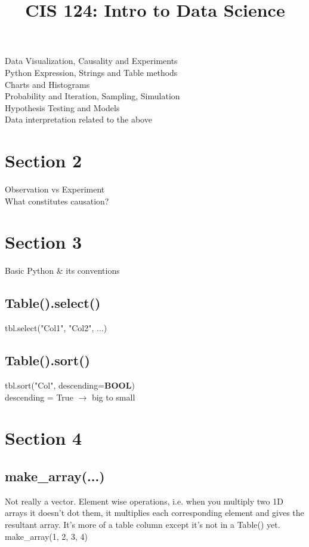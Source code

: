 \documentclass[10pt, a4paper, twocolumn]{article}
\title{CIS 124: Intro to Data Science}
\author{\authorstyle{Miles Kent}}
\date{}
\begin{document}
\graphicspath{ {./images/} }

\maketitle


    Data Visualization, Causality and Experiments\\
    Python Expression, Strings and Table methods\\
    Charts and Histograms\\
    Probability and Iteration, Sampling, Simulation\\
    Hypothesis Testing and Models\\
    Data interpretation related to the above\\

    \section{Section 2}
    Observation vs Experiment\\
    What constitutes causation?\\

    \section{Section 3}
    Basic Python \& its conventions\\
    \subsection{Table().select()}
    tbl.select("Col1", "Col2", ...)
    \subsection{Table().sort()}
    tbl.sort("Col", descending=$\textbf{BOOL}$)\\
    descending = True $\rightarrow$ big to small\\

    \section{Section 4}
    \subsection{make\_array(...)}
    Not really a vector. Element wise operations, i.e. when you multiply two 1D arrays it doesn't dot them, it multiplies each corresponding element and gives the resultant array. It's more of a table column except it's not in a Table() yet.\\
    make\_array(1, 2, 3, 4)\\
\end{document}
